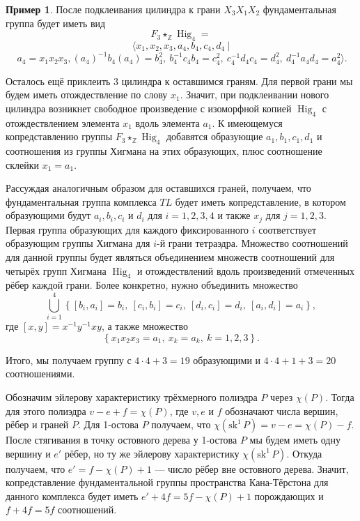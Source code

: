 \documentclass[14pt, dvipsnames, twoside]{extarticle}
\theoremstyle{definition}
\newtheorem{example}{Пример}
\theoremstyle{remark}
\DeclareMathOperator{\Hig}{\mathrm{Hig}}
\begin{document}
\begin{example}
После подклеивания цилиндра к грани $X_3X_1X_2$ фундаментальная группа будет иметь вид $$F_3\star_{\mathbb{Z}}\Hig_4 =$$ $$ \langle x_1, x_2, x_3, a_4, b_4, c_4, d_4\ | $$ $$\ a_4 = x_1x_2x_3, (a_4)^{-1}b_4(a_4) = b_4^2,\ b_4^{-1}c_4b_4 = c_4^2,\ c_4^{-1} d_4c_4 = d_4^2, \ d_4^{-1} a_4d_4 = a_4^2 \rangle.$$

Осталось ещё приклеить 3 цилиндра к оставшимся граням. Для первой грани мы будем иметь отождествление по слову $x_1$. Значит, при подклеивании нового цилиндра возникнет свободное произведение с изоморфной копией $\Hig_4$ с отождествлением элемента $x_1$ вдоль элемента $a_1$. К имеющемуся копредставлению группы $F_3\star_\mathbb{Z}\Hig_4$ добавятся образующие $a_1, b_1, c_1, d_1$ и соотношения из группы Хигмана на этих образующих, плюс соотношение склейки $x_1 = a_1$. 

Рассуждая аналогичным образом для оставшихся граней, получаем, что фундаментальная группа комплекса $TL$ будет иметь копредставление, в котором образующими будут $a_i, b_i, c_i$ и $d_i$ для $i = 1, 2, 3, 4$ и также $x_j$ для $j = 1, 2, 3$. Первая группа образующих для каждого фиксированного $i$ соответствует образующим группы Хигмана для $i$-й грани тетраэдра. Множество соотношений для данной группы будет являться объединением множеств соотношений для четырёх групп Хигмана $\Hig_4$ и отождествлений вдоль произведений отмеченных рёбер каждой грани. Более конкретно, нужно объединить множество $$\bigcup\limits_{i=1}^4\left\{ [b_i, a_i] = b_i,\ [c_i, b_i] = c_i,\ [d_i, c_i] = d_i,\ [a_i, d_i] = a_i\right\},$$ где $[x, y] = x^{-1}y^{-1}xy$, а также множество $$\left\{ x_1x_2x_3 = a_1,\ x_k = a_k,\ k = 1, 2, 3 \right\}.$$

Итого, мы получаем группу с $4\cdot 4 + 3 = 19$ образующими и $4\cdot 4 + 1 + 3 = 20$ соотношениями.


\end{example}







Обозначим эйлерову характеристику трёхмерного полиэдра $P$ через $\chi(P)$. Тогда для этого полиэдра $v - e + f = \chi(P)$, где $v, e$ и $f$ обозначают числа вершин, рёбер и граней $P$. Для 1-остова $P$ получаем, что $\chi(\mathrm{sk}^1\, P) = v - e = \chi(P) - f$. После стягивания в точку остовного дерева у 1-остова $P$ мы будем иметь одну вершину и $e'$ рёбер, но ту же эйлерову характеристику $\chi(\mathrm{sk}^1\, P)$. Откуда получаем, что $e' = f - \chi(P) + 1$ --- число рёбер вне остовного дерева. Значит, копредставление фундаментальной группы пространства Кана-Тёрстона для данного комплекса будет иметь $e' + 4f = 5f - \chi(P) + 1$ порождающих и $f + 4f = 5f$ соотношений. 
\end{document}
